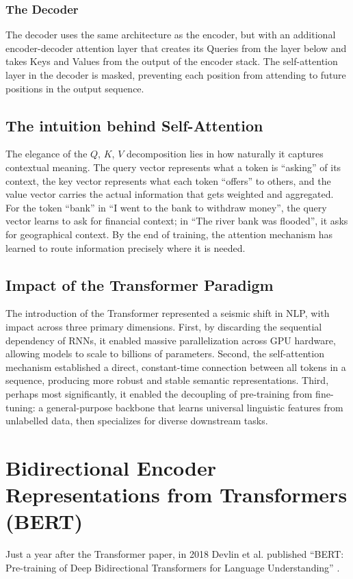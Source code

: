 \documentclass[a4paper,12pt]{article}
\begin{document}
\subsubsection{The Decoder}
The decoder uses the same architecture as the encoder, but with an additional encoder-decoder attention layer that creates its Queries from the layer below and takes Keys and Values from the output of the encoder stack. The self-attention layer in the decoder is masked, preventing each position from attending to future positions in the output sequence.

\subsection{The intuition behind Self-Attention}
The elegance of the $Q$, $K$, $V$ decomposition lies in how naturally it captures contextual meaning. The query vector represents what a token is ``asking'' of its context, the key vector represents what each token ``offers'' to others, and the value vector carries the actual information that gets weighted and aggregated. For the token ``bank'' in ``I went to the bank to withdraw money'', the query vector learns to ask for financial context; in ``The river bank was flooded'', it asks for geographical context. By the end of training, the attention mechanism has learned to route information precisely where it is needed.

\subsection{Impact of the Transformer Paradigm}
The introduction of the Transformer represented a seismic shift in NLP, with impact across three primary dimensions. First, by discarding the sequential dependency of RNNs, it enabled massive parallelization across GPU hardware, allowing models to scale to billions of parameters. Second, the self-attention mechanism established a direct, constant-time connection between all tokens in a sequence, producing more robust and stable semantic representations. Third, perhaps most significantly, it enabled the decoupling of pre-training from fine-tuning: a general-purpose backbone that learns universal linguistic features from unlabelled data, then specializes for diverse downstream tasks.

\section{Bidirectional Encoder Representations from Transformers (BERT)}
Just a year after the Transformer paper, in 2018 Devlin et al. published ``BERT: Pre-training of Deep Bidirectional Transformers for Language Understanding'' \citep{devlin2019bert}.
\end{document}
